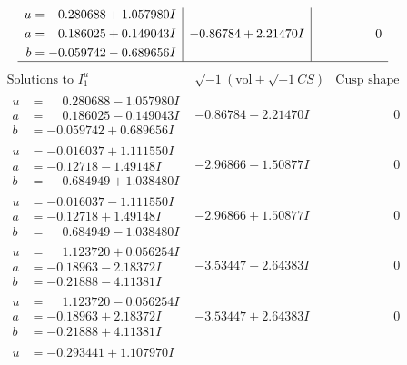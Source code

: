 \documentclass[1p]{elsarticle_modified}
\theoremstyle{definition}
\newcommand{\I}{\sqrt{-1}}
\begin{document}
$$\begin{array}{c|c|c}
\begin{aligned}
u &= \phantom{-}0.280688 + 1.057980 I \\
a &= \phantom{-}0.186025 + 0.149043 I \\
b &= -0.059742 - 0.689656 I\end{aligned}
 & -0.86784 + 2.21470 I & \phantom{-0.000000 } 0\\
 \hline 
 \end{array}$$\newpage$$\begin{array}{c|c|c}  
\text{Solutions to }I^u_{1}& \I (\text{vol} + \sqrt{-1}CS) & \text{Cusp shape}\\
 \hline 
\begin{aligned}
u &= \phantom{-}0.280688 - 1.057980 I \\
a &= \phantom{-}0.186025 - 0.149043 I \\
b &= -0.059742 + 0.689656 I\end{aligned}
 & -0.86784 - 2.21470 I & \phantom{-0.000000 } 0 \\ \hline\begin{aligned}
u &= -0.016037 + 1.111550 I \\
a &= -0.12718 - 1.49148 I \\
b &= \phantom{-}0.684949 + 1.038480 I\end{aligned}
 & -2.96866 - 1.50877 I & \phantom{-0.000000 } 0 \\ \hline\begin{aligned}
u &= -0.016037 - 1.111550 I \\
a &= -0.12718 + 1.49148 I \\
b &= \phantom{-}0.684949 - 1.038480 I\end{aligned}
 & -2.96866 + 1.50877 I & \phantom{-0.000000 } 0 \\ \hline\begin{aligned}
u &= \phantom{-}1.123720 + 0.056254 I \\
a &= -0.18963 - 2.18372 I \\
b &= -0.21888 - 4.11381 I\end{aligned}
 & -3.53447 - 2.64383 I & \phantom{-0.000000 } 0 \\ \hline\begin{aligned}
u &= \phantom{-}1.123720 - 0.056254 I \\
a &= -0.18963 + 2.18372 I \\
b &= -0.21888 + 4.11381 I\end{aligned}
 & -3.53447 + 2.64383 I & \phantom{-0.000000 } 0 \\ \hline\begin{aligned}
u &= -0.293441 + 1.107970 I \\

\end{aligned}
\end{array}$$
\end{document}

